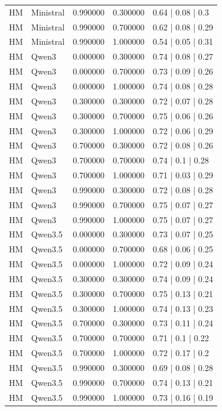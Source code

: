 \begin{longtable}{lllll}
HM & Ministral & 0.990000 & 0.300000 & 0.64 | 0.08 | 0.3 \\
HM & Ministral & 0.990000 & 0.700000 & 0.62 | 0.08 | 0.29 \\
HM & Ministral & 0.990000 & 1.000000 & 0.54 | 0.05 | 0.31 \\
HM & Qwen3 & 0.000000 & 0.300000 & 0.74 | 0.08 | 0.27 \\
HM & Qwen3 & 0.000000 & 0.700000 & 0.73 | 0.09 | 0.26 \\
HM & Qwen3 & 0.000000 & 1.000000 & 0.74 | 0.08 | 0.28 \\
HM & Qwen3 & 0.300000 & 0.300000 & 0.72 | 0.07 | 0.28 \\
HM & Qwen3 & 0.300000 & 0.700000 & 0.75 | 0.06 | 0.26 \\
HM & Qwen3 & 0.300000 & 1.000000 & 0.72 | 0.06 | 0.29 \\
HM & Qwen3 & 0.700000 & 0.300000 & 0.72 | 0.08 | 0.26 \\
HM & Qwen3 & 0.700000 & 0.700000 & 0.74 | 0.1 | 0.28 \\
HM & Qwen3 & 0.700000 & 1.000000 & 0.71 | 0.03 | 0.29 \\
HM & Qwen3 & 0.990000 & 0.300000 & 0.72 | 0.08 | 0.28 \\
HM & Qwen3 & 0.990000 & 0.700000 & 0.75 | 0.07 | 0.27 \\
HM & Qwen3 & 0.990000 & 1.000000 & 0.75 | 0.07 | 0.27 \\
HM & Qwen3.5 & 0.000000 & 0.300000 & 0.73 | 0.07 | 0.25 \\
HM & Qwen3.5 & 0.000000 & 0.700000 & 0.68 | 0.06 | 0.25 \\
HM & Qwen3.5 & 0.000000 & 1.000000 & 0.72 | 0.09 | 0.24 \\
HM & Qwen3.5 & 0.300000 & 0.300000 & 0.74 | 0.09 | 0.24 \\
HM & Qwen3.5 & 0.300000 & 0.700000 & 0.75 | 0.13 | 0.21 \\
HM & Qwen3.5 & 0.300000 & 1.000000 & 0.74 | 0.13 | 0.23 \\
HM & Qwen3.5 & 0.700000 & 0.300000 & 0.73 | 0.11 | 0.24 \\
HM & Qwen3.5 & 0.700000 & 0.700000 & 0.71 | 0.1 | 0.22 \\
HM & Qwen3.5 & 0.700000 & 1.000000 & 0.72 | 0.17 | 0.2 \\
HM & Qwen3.5 & 0.990000 & 0.300000 & 0.69 | 0.08 | 0.28 \\
HM & Qwen3.5 & 0.990000 & 0.700000 & 0.74 | 0.13 | 0.21 \\
HM & Qwen3.5 & 0.990000 & 1.000000 & 0.73 | 0.16 | 0.19 \\

\end{longtable}
